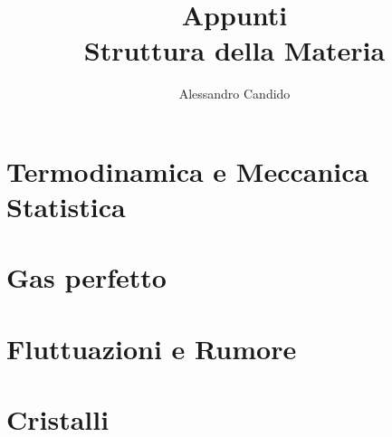 \documentclass[a4paper,10pt]{book}
\title{Appunti \\
		\Large Struttura della Materia}
\author{Alessandro Candido}
\theoremstyle{plain}%
\theoremstyle{definition}
\begin{document}
\frontmatter
\maketitle



\mainmatter
\chapter{Termodinamica e Meccanica Statistica}



\chapter{Gas perfetto}

\chapter{Fluttuazioni e Rumore}

\chapter{Cristalli}

\appendix
\end{document}

